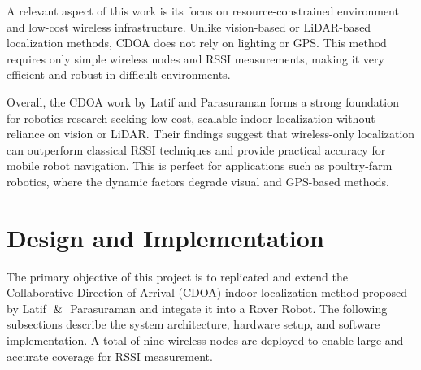 \documentclass[conference]{IEEEtran}
\begin{document}
A relevant aspect of this work is its focus on resource-constrained environment and low-cost wireless infrastructure. Unlike vision-based or LiDAR-based localization methods, CDOA does not rely on lighting or GPS. This method requires only simple wireless nodes and RSSI measurements, making it very efficient and robust in difficult environments. 

Overall, the CDOA work by Latif and Parasuraman forms a strong foundation for robotics research seeking low-cost, scalable indoor localization without reliance on vision or LiDAR. Their findings suggest that wireless-only localization can outperform classical RSSI techniques and provide practical accuracy for mobile robot navigation. This is perfect for applications such as poultry-farm robotics, where the dynamic factors degrade visual and GPS-based methods.

\section{Design and Implementation}
The primary objective of this project is to replicated and extend the Collaborative Direction of Arrival (CDOA) indoor localization method proposed by Latif $\And$ Parasuraman \cite{b1} and integate it into a Rover Robot. The following subsections describe the system architecture, hardware setup, and software implementation. A total of nine wireless nodes are deployed to enable large and accurate coverage for RSSI measurement. 
\end{document}
